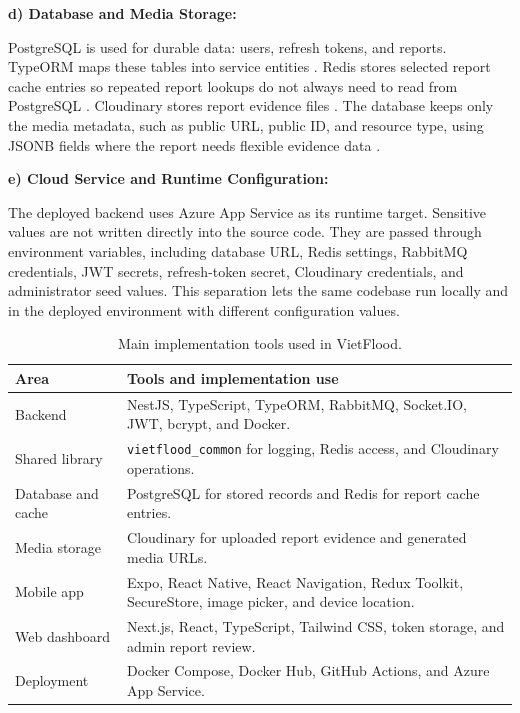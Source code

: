 \vspace{1em}
\noindent
\textbf{d) Database and Media Storage:}

PostgreSQL is used for durable data: users, refresh tokens, and reports. TypeORM maps these tables into service entities \cite{typeormDocs}. Redis stores selected report cache entries so repeated report lookups do not always need to read from PostgreSQL \cite{redisDocs}. Cloudinary stores report evidence files \cite{cloudinaryUploadDocs}. The database keeps only the media metadata, such as public URL, public ID, and resource type, using JSONB fields where the report needs flexible evidence data \cite{postgresqlJsonDocs}.

\vspace{1em}
\noindent
\textbf{e) Cloud Service and Runtime Configuration:}

The deployed backend uses Azure App Service as its runtime target. Sensitive values are not written directly into the source code. They are passed through environment variables, including database URL, Redis settings, RabbitMQ credentials, JWT secrets, refresh-token secret, Cloudinary credentials, and administrator seed values. This separation lets the same codebase run locally and in the deployed environment with different configuration values.

\begin{table}[H]
    \centering
    \caption{Main implementation tools used in VietFlood.}
    \setlength{\tabcolsep}{10pt}
    \renewcommand{\arraystretch}{1.35}
    \begin{tabular}{|p{3.4cm}|p{9.2cm}|}
        \hline
        \textbf{Area} & \textbf{Tools and implementation use} \\
        \hline
        Backend & NestJS, TypeScript, TypeORM, RabbitMQ, Socket.IO, JWT, bcrypt, and Docker. \\
        \hline
        Shared library & \texttt{vietflood\_common} for logging, Redis access, and Cloudinary operations. \\
        \hline
        Database and cache & PostgreSQL for stored records and Redis for report cache entries. \\
        \hline
        Media storage & Cloudinary for uploaded report evidence and generated media URLs. \\
        \hline
        Mobile app & Expo, React Native, React Navigation, Redux Toolkit, SecureStore, image picker, and device location. \\
        \hline
        Web dashboard & Next.js, React, TypeScript, Tailwind CSS, token storage, and admin report review. \\
        \hline
        Deployment & Docker Compose, Docker Hub, GitHub Actions, and Azure App Service. \\
        \hline
    \end{tabular}
    \label{tab:vietflood-implementation-tools}
\end{table}

